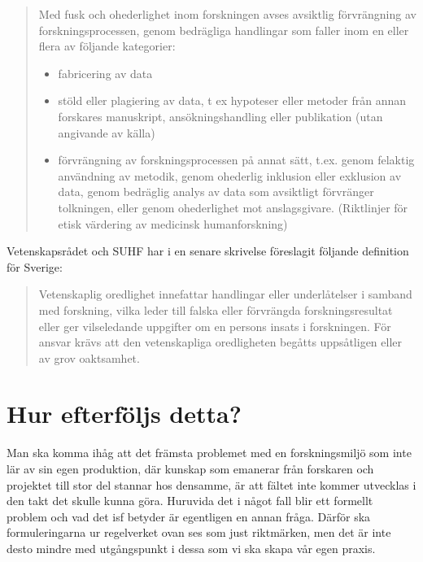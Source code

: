 \documentclass{article}
\begin{document}
\begin{quote}
  Med fusk och ohederlighet inom forskningen avses avsiktlig
  förvrängning av forskningsprocessen, genom bedrägliga handlingar som
  faller inom en eller flera av följande kategorier:
  \begin{itemize}
  \item fabricering av data

  \item stöld eller plagiering av data, t ex hypoteser eller metoder
    från annan forskares manuskript, ansökningshandling eller
    publikation (utan angivande av källa)

  \item förvrängning av forskningsprocessen på annat sätt, t.ex. genom
    felaktig användning av metodik, genom ohederlig inklusion eller
    exklusion av data, genom bedräglig analys av data som avsiktligt
    förvränger tolkningen, eller genom ohederlighet mot
    anslagsgivare. (Riktlinjer för etisk värdering av medicinsk
    humanforskning)
  \end{itemize}
\end{quote}

Vetenskapsrådet och SUHF har i en senare skrivelse föreslagit följande definition för Sverige:

\begin{quote}
  Vetenskaplig oredlighet innefattar handlingar eller underlåtelser i
  samband med forskning, vilka leder till falska eller förvrängda
  forskningsresultat eller ger vilseledande uppgifter om en persons
  insats i forskningen. För ansvar krävs att den vetenskapliga
  oredligheten begåtts uppsåtligen eller av grov oaktsamhet.
\end{quote}

\section{Hur efterföljs detta?}

Man ska komma ihåg att det främsta problemet med en forskningsmiljö som inte lär av sin egen produktion, där kunskap som emanerar från forskaren och projektet till stor del stannar hos densamme, är att fältet inte kommer utvecklas i den takt det skulle kunna göra. Huruvida det i något fall blir ett formellt problem och vad det isf betyder är egentligen en annan fråga. Därför ska formuleringarna ur regelverket ovan ses som just riktmärken, men det är inte desto mindre med utgångspunkt i dessa som vi ska skapa vår egen praxis.
\end{document}
